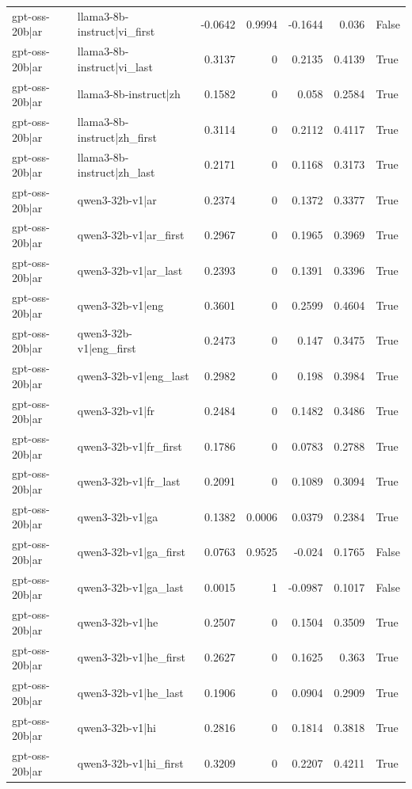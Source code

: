 \begin{table}
\begin{tabular}{l l r r r r l}
gpt-oss-20b|ar & llama3-8b-instruct|vi_first & -0.0642 & 0.9994 & -0.1644 & 0.036 & False \\
gpt-oss-20b|ar & llama3-8b-instruct|vi_last & 0.3137 & 0 & 0.2135 & 0.4139 & True \\
gpt-oss-20b|ar & llama3-8b-instruct|zh & 0.1582 & 0 & 0.058 & 0.2584 & True \\
gpt-oss-20b|ar & llama3-8b-instruct|zh_first & 0.3114 & 0 & 0.2112 & 0.4117 & True \\
gpt-oss-20b|ar & llama3-8b-instruct|zh_last & 0.2171 & 0 & 0.1168 & 0.3173 & True \\
gpt-oss-20b|ar & qwen3-32b-v1|ar & 0.2374 & 0 & 0.1372 & 0.3377 & True \\
gpt-oss-20b|ar & qwen3-32b-v1|ar_first & 0.2967 & 0 & 0.1965 & 0.3969 & True \\
gpt-oss-20b|ar & qwen3-32b-v1|ar_last & 0.2393 & 0 & 0.1391 & 0.3396 & True \\
gpt-oss-20b|ar & qwen3-32b-v1|eng & 0.3601 & 0 & 0.2599 & 0.4604 & True \\
gpt-oss-20b|ar & qwen3-32b-v1|eng_first & 0.2473 & 0 & 0.147 & 0.3475 & True \\
gpt-oss-20b|ar & qwen3-32b-v1|eng_last & 0.2982 & 0 & 0.198 & 0.3984 & True \\
gpt-oss-20b|ar & qwen3-32b-v1|fr & 0.2484 & 0 & 0.1482 & 0.3486 & True \\
gpt-oss-20b|ar & qwen3-32b-v1|fr_first & 0.1786 & 0 & 0.0783 & 0.2788 & True \\
gpt-oss-20b|ar & qwen3-32b-v1|fr_last & 0.2091 & 0 & 0.1089 & 0.3094 & True \\
gpt-oss-20b|ar & qwen3-32b-v1|ga & 0.1382 & 0.0006 & 0.0379 & 0.2384 & True \\
gpt-oss-20b|ar & qwen3-32b-v1|ga_first & 0.0763 & 0.9525 & -0.024 & 0.1765 & False \\
gpt-oss-20b|ar & qwen3-32b-v1|ga_last & 0.0015 & 1 & -0.0987 & 0.1017 & False \\
gpt-oss-20b|ar & qwen3-32b-v1|he & 0.2507 & 0 & 0.1504 & 0.3509 & True \\
gpt-oss-20b|ar & qwen3-32b-v1|he_first & 0.2627 & 0 & 0.1625 & 0.363 & True \\
gpt-oss-20b|ar & qwen3-32b-v1|he_last & 0.1906 & 0 & 0.0904 & 0.2909 & True \\
gpt-oss-20b|ar & qwen3-32b-v1|hi & 0.2816 & 0 & 0.1814 & 0.3818 & True \\
gpt-oss-20b|ar & qwen3-32b-v1|hi_first & 0.3209 & 0 & 0.2207 & 0.4211 & True \\

\end{tabular}
\end{table}
